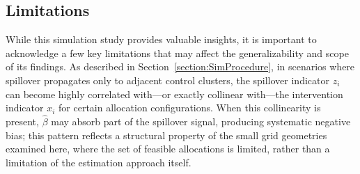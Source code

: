 \documentclass{article}[11pt]
\begin{document}
\subsection{Limitations}

While this simulation study provides valuable insights, it is important to acknowledge a few key limitations that may affect the generalizability and scope of its findings. As described in Section~\ref{section:SimProcedure}, in scenarios where spillover propagates only to adjacent control clusters, the spillover indicator $z_i$ can become highly correlated with---or exactly collinear with---the intervention indicator $x_i$ for certain allocation configurations. When this collinearity is present, $\hat{\beta}$ may absorb part of the spillover signal, producing systematic negative bias; this pattern reflects a structural property of the small grid geometries examined here, where the set of feasible allocations is limited, rather than a limitation of the estimation approach itself. %
\end{document}
